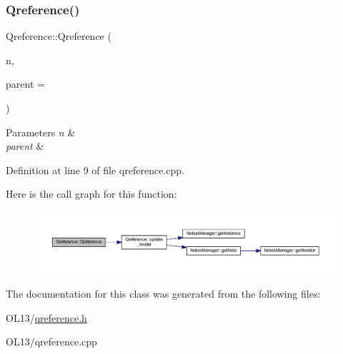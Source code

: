 \subsubsection{\texorpdfstring{Qreference()}{Qreference()}}
{\footnotesize\ttfamily Qreference\+::\+Qreference (\begin{DoxyParamCaption}\item[{\hyperlink{class_note}{Note} \&}]{n,  }\item[{Q\+Widget $\ast$}]{parent = {} }\end{DoxyParamCaption})\hspace{0.3cm}{\ttfamily [explicit]}}


\begin{DoxyParams}{Parameters}
{\em n} & \\
\hline
{\em parent} & \\
\hline
\end{DoxyParams}


Definition at line 9 of file qreference.\+cpp.

Here is the call graph for this function\+:\nopagebreak
\begin{figure}[H]
\begin{center}
\leavevmode
\includegraphics[width=350pt]{class_qreference_ab95224276a2abcdd26376291da58da47_cgraph}
\end{center}
\end{figure}


The documentation for this class was generated from the following files\+:\begin{DoxyCompactItemize}
\item 
O\+L13/\hyperlink{qreference_8h}{qreference.\+h}\item 
O\+L13/qreference.\+cpp\end{DoxyCompactItemize}
